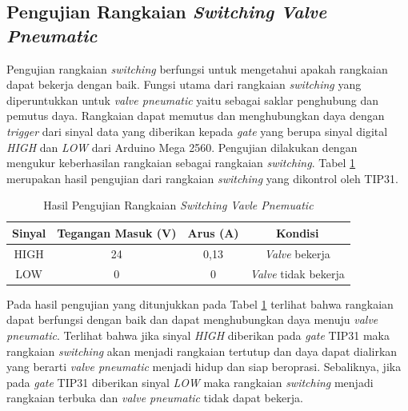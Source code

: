 \subsection{Pengujian Rangkaian \textit{Switching Valve Pneumatic}}
Pengujian rangkaian \textit{switching} berfungsi untuk mengetahui apakah rangkaian dapat bekerja dengan baik. Fungsi utama dari rangkaian \textit{switching} yang diperuntukkan untuk \textit{valve pneumatic} yaitu sebagai saklar penghubung dan pemutus daya. Rangkaian dapat memutus dan menghubungkan daya dengan \textit{trigger} dari sinyal data yang diberikan kepada \textit{gate} yang berupa sinyal digital \textit{HIGH} dan \textit{LOW} dari Arduino Mega 2560. Pengujian dilakukan dengan mengukur keberhasilan rangkaian sebagai rangkaian \textit{switching}. Tabel \ref{tbl.rangkaiantip} merupakan hasil pengujian dari rangkaian \textit{switching} yang dikontrol oleh TIP31.
\begin{table}[H]
	\centering
	\caption{Hasil Pengujian Rangkaian \textit{Switching Vavle Pnemuatic}}
	\label{tbl.rangkaiantip}
	\begin{tabular}{|c|c|c|c|}
		\hline
		\rowcolor[HTML]{9B9B9B} 
		Sinyal & Tegangan Masuk (V) & Arus (A) & Kondisi             \\ \hline
		HIGH   & 24                 & 0,13     & \textit{Valve} bekerja       \\ \hline
		LOW    & 0                  & 0      & \textit{Valve} tidak bekerja \\ \hline
	\end{tabular}
	
\end{table} 

Pada hasil pengujian yang ditunjukkan pada Tabel \ref{tbl.rangkaiantip} terlihat bahwa rangkaian dapat berfungsi dengan baik dan dapat menghubungkan daya menuju \textit{valve pneumatic}. Terlihat bahwa jika sinyal \textit{HIGH} diberikan pada \textit{gate} TIP31 maka rangkaian \textit{switching} akan menjadi rangkaian tertutup dan daya dapat dialirkan yang berarti \textit{valve pneumatic} menjadi hidup dan siap beroprasi. Sebaliknya, jika pada \textit{gate} TIP31 diberikan sinyal \textit{LOW} maka rangkaian \textit{switching} menjadi rangkaian terbuka dan \textit{valve pneumatic} tidak dapat bekerja.



